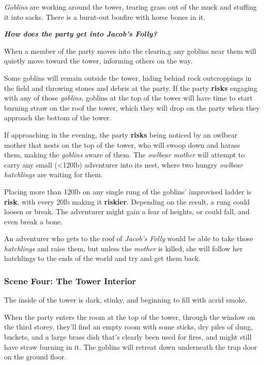 \documentclass[11pt]{teraum_adventure}
\begin{document}
\emph{Goblins} are working around the tower, tearing grass out of the muck
and stuffing it into sacks. There is a burnt-out bonfire with horse
bones in it.

\textbf{\emph{How does the party get into Jacob's Folly?}}

When a member of the party moves into the clearin,g any goblins near
them will quietly move toward the tower, informing others on the way.

Some goblins will remain outside the tower, hiding behind rock
outcroppings in the field and throwing stones and debris at the party.
If the party \textbf{risks} engaging with any of those \emph{goblins}, goblins at
the top of the tower will have time to start burning straw on the roof
the tower, which they will drop on the party when they approach the
bottom of the tower.

If approaching in the evening, the party \textbf{risks} being noticed by an
owlbear mother that nests on the top of the tower, who will swoop down
and harass them, making the \emph{goblins} aware of them. The \emph{owlbear
mother} will attempt to carry any small (<120lb) adventurer into its
nest, where two hungry \emph{owlbear hatchlings} are waiting for them.


Placing more than 120lb on any single rung of the goblins' improvised
ladder is \textbf{risk}, with every 20lb making it \textbf{riskier}. Depending on
the result, a rung could loosen or break. The adventurer might gain a
fear of heights, or could fall, and even break a bone.

An adventurer who gets to the roof of \emph{Jacob's Folly} would be able
to take those \emph{hatchlings} and raise them, but unless the \emph{mother} is
killed, she will follow her hatchlings to the ends of the world and
try and get them back.
\subsubsection*{Scene Four: The Tower Interior}
\label{sec:orgb3bc24a}
The inside of the tower is dark, stinky, and beginning to fill with
acrid smoke.

When the party enters the room at the top of the tower, through the
window on the third storey, they'll find an empty room with some
sticks, dry piles of dung, buckets, and a large brass dish that's
clearly been used for fires, and might still have straw burning in it.
The goblins will retreat down underneath the trap door on the ground
floor.
\end{document}
